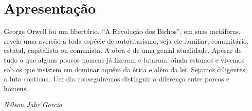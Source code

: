 \chapter*{Apresentação}

George Orwell foi um libertário. \enquote{A Revolução dos Bichos}, em suas metáforas, revela uma aversão a toda espécie de autoritarismo, seja ele familiar, comunitário, estatal, capitalista ou comunista. A obra é de uma genial atualidade. Apesar de tudo o que alguns poucos homens já fizeram e lutaram, ainda estamos e vivemos sob os que insistem em dominar aquém da ética e além da lei. Sejamos diligentes, a luta continua. Um dia conseguiremos distinguir a diferença entre porcos e homens.

\textit{Nélson Jahr Garcia}

\clearpage
